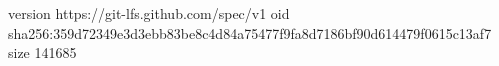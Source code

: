version https://git-lfs.github.com/spec/v1
oid sha256:359d72349e3d3ebb83be8c4d84a75477f9fa8d7186bf90d614479f0615c13af7
size 141685
